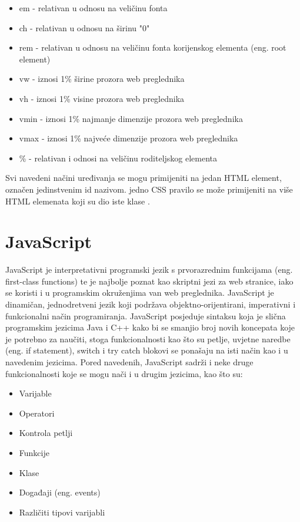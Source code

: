\documentclass[12pt, oneside, onecolumn]{book}
\begin{document}
{\begin{itemize}
\item em - relativan u odnosu na veličinu fonta
\item ch - relativan u odnosu na širinu "0"
\item rem - relativan u odnosu na veličinu fonta korijenskog elementa (eng. root element)
\item vw - iznosi 1\% širine prozora web preglednika
\item vh - iznosi 1\% visine prozora web preglednika
\item vmin - iznosi 1\% najmanje dimenzije prozora web preglednika
\item vmax - iznosi 1\% najveće dimenzije prozora web preglednika
\item \% - relativan i odnosi na veličinu roditeljskog elementa
\end{itemize}

Svi navedeni načini uređivanja se mogu primijeniti na jedan HTML element, označen jedinstvenim id nazivom. jedno CSS pravilo se može primijeniti na više HTML elemenata koji su dio iste klase \cite{css_tut}.

\section{JavaScript}
JavaScript je interpretativni programski jezik s prvorazrednim funkcijama (eng. first-class functions) te je najbolje poznat kao skriptni jezi za web stranice, iako se koristi i u programskim okruženjima van web preglednika. JavaScript je dinamičan, jednodretveni jezik koji podržava objektno-orijentirani, imperativni i funkcionalni način programiranja. JavaScript posjeduje sintaksu koja je slična programskim jezicima Java i C++ kako bi se smanjio broj novih koncepata koje je potrebno za naučiti, stoga funkcionalnosti kao što su petlje, uvjetne naredbe (eng. if statement), switch i try catch blokovi se ponašaju na isti način kao i u navedenim jezicima. Pored navedenih, JavaScript sadrži i neke druge funkcionalnosti koje se mogu nači i u drugim jezicima, kao što su:

\pagebreak

\begin{itemize}
\item Varijable
\item Operatori
\item Kontrola petlji 
\item Funkcije
\item Klase
\item Događaji (eng. events)
\item Različiti tipovi varijabli
\end{itemize}

}
\end{document}

